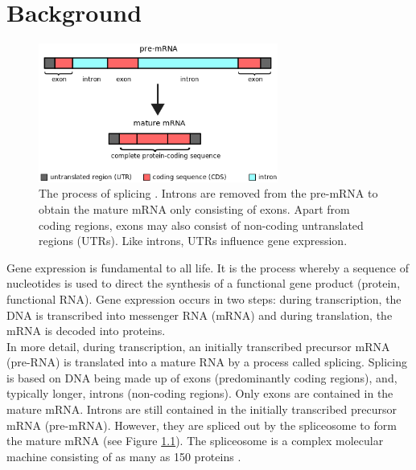 \chapter{\label{ch:2-litreview}Background}

\minitoc

\begin{figure}[h]
	\centering\includegraphics[width=0.7\textwidth]{../visualizations/ch2-biobackground/pre-mrna2mrna.png} 
	\caption
	{The process of splicing \cite{img:mrna}. Introns are removed from the pre-mRNA to obtain the mature mRNA only consisting of exons. Apart from coding regions, exons may also consist of non-coding untranslated regions (UTRs). Like introns, UTRs influence gene expression. 
	}
	\label{fig:pre-mrna2mrna}
\end{figure}

Gene expression is fundamental to all life. It is the process whereby a sequence of nucleotides is used to direct the synthesis of a functional gene product (protein, functional RNA). Gene expression occurs in two steps: during transcription, the DNA is transcribed into messenger RNA (mRNA) and during translation, the mRNA is decoded into proteins.\\
In more detail, during transcription, an initially transcribed precursor mRNA (pre-RNA) is translated into a mature RNA by a process called splicing. Splicing is based on DNA being made up of exons (predominantly coding regions), and, typically longer, introns (non-coding regions).
Only exons are contained in the mature mRNA. Introns are still contained in the initially transcribed precursor mRNA (pre-mRNA). However, they are spliced out by the spliceosome to form the mature mRNA (see Figure \ref{fig:pre-mrna2mrna}). The spliceosome is a complex molecular machine consisting of as many as 150 proteins \cite{splicing_current_perspectives}. 

